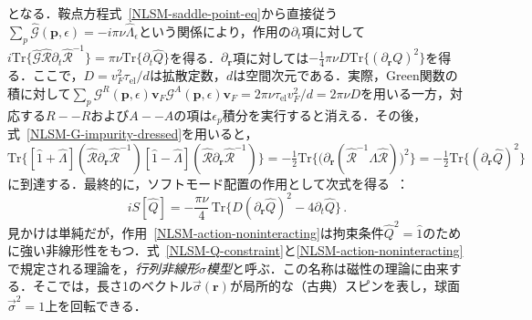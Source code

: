 \documentclass[a4paper,11pt]{ltjsarticle}
\def\Tr{\mathrm{Tr}}
\def\tauel{\tau_{\mathrm{el}}}
\begin{document}
となる．鞍点方程式~\eqref{NLSM-saddle-point-eq}から直接従う$\sum_{p}\hat{\mathcal{G}}(\mathbf{p},\epsilon)=-i\pi\nu\hat{\Lambda}_{\epsilon}$という関係により，作用の$\partial_{t}$項に対して$i\Tr\{\hat{\mathcal{G}}\hat{\mathcal{R}}\partial_{t}\hat{\mathcal{R}}^{-1}\}=
\pi\nu\Tr\{\partial_{t}\hat{Q}\}$を得る．$\partial_{\mathbf{r}}$項に対しては$-\frac{1}{4}\pi\nu D\Tr\big\{(\partial_{\mathbf{r}}
Q)^{2}\big\}$を得る．ここで，$D=v^{2}_{F}\tauel/d$は拡散定数，$d$は空間次元である．実際，Green関数の積に対して$\sum_{p}\mathcal{G}^{R}(\mathbf{p},\epsilon)\mathbf{v}_{F}
\mathcal{G}^{A}(\mathbf{p},\epsilon)\mathbf{v}_{F}=2\pi\nu\tauel
v^{2}_{F}/d=2\pi\nu D$を用いる一方，対応する$R--R$および$A--A$の項は$\epsilon_{p}$積分を実行すると消える．その後，式~\eqref{NLSM-G-impurity-dressed}を用いると，$\Tr\big\{[\hat{1}+\hat{\Lambda}]
(\hat{\mathcal{R}}\partial_{\mathbf{r}} \hat{\mathcal{R}}^{-1})
[\hat{1}-\hat{\Lambda}](\hat{\mathcal{R}}
\partial_{\mathbf{r}}\hat{\mathcal{R}}^{-1})\big\}=-\frac{1}{2}
\Tr\big\{\big(\partial_{\mathbf{r}}(\hat{\mathcal{R}}^{-1}
\hat{\Lambda}\hat{\mathcal{R}})\big)^{2}\big\}=
-\frac{1}{2}\Tr\big\{(\partial_{\mathbf{r}}\hat{Q})^{2}\big\}$に到達する．最終的に，ソフトモード配置の作用として次式を得る~\cite{HorbachSchon,Kamenev:1999zza,Chamon:1999zz}：
\begin{equation}\label{NLSM-action-noninteracting}
iS[\hat Q]=-\frac{\pi\nu}{4}\,\Tr\Big\{D(\partial_{\mathbf{r}}
\hat{Q})^{2}-4\partial_{t}\hat{Q}\Big\}\,.
\end{equation}
見かけは単純だが，作用~\eqref{NLSM-action-noninteracting}は拘束条件$\hat{Q}^{2}=\hat{1}$のために強い非線形性をもつ．式~\eqref{NLSM-Q-constraint}と\eqref{NLSM-action-noninteracting}で規定される理論を，{\em 行列非線形$\sigma$模型}と呼ぶ．この名称は磁性の理論に由来する．そこでは，長さ1のベクトル$\vec \sigma(\mathbf{r})$が局所的な（古典）スピンを表し，球面$\vec \sigma^{2}=1$上を回転できる．
\end{document}

